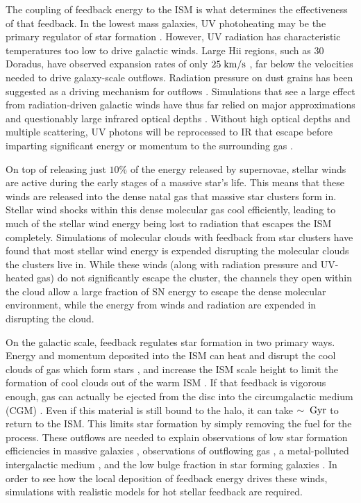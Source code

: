 The coupling of feedback energy to the ISM is what determines the effectiveness
of that feedback.  In the lowest mass galaxies, UV photoheating may be the
primary regulator of star formation \citep{Efstathiou1992}.    However, UV
radiation has characteristic temperatures too low to drive galactic winds.
Large {\sc Hii} regions, such as 30 Doradus, have observed expansion rates of
only $25\;\rm{km/s}$ \citep{Chu1994}, far below the velocities needed to drive
galaxy-scale outflows.  Radiation pressure on dust grains has been suggested as
a driving mechanism for outflows \citep{Murray2011}.  Simulations that see a
large effect from radiation-driven galactic winds have thus far relied on major approximations
\citep{Roskar2014,Agertz2015} and questionably large infrared optical depths
\citep{Hopkins2014}.  Without high optical depths and multiple scattering, UV
photons will be reprocessed to IR that escape before imparting significant
energy or momentum to the surrounding gas \citep{Dale2005,Walch2012,Krumholz2013}.

On top of releasing just $10\%$ of the energy released by supernovae, stellar
winds are active during the early stages of a massive star's life.  This means
that these winds are released into the dense natal gas that massive star
clusters form in.  Stellar wind shocks within this dense molecular gas cool
efficiently, leading to much of the stellar wind energy being lost to radiation
that escapes the ISM completely.  Simulations of molecular clouds with feedback
from star clusters \citep{Gendelev2012,Rogers2013} have found that most stellar
wind energy is expended disrupting the molecular clouds the clusters live in.
While these winds (along with radiation pressure and UV-heated gas) do not
significantly escape the cluster, the channels they open within the cloud allow
a large fraction of SN energy to escape the dense molecular environment, while
the energy from winds and radiation are expended in disrupting the cloud.

On the galactic scale, feedback regulates star formation in two primary ways.
Energy and momentum deposited into the ISM can heat and disrupt the cool clouds
of gas which form stars \citep{Rogers2013}, and increase the ISM scale height to
limit the formation of cool clouds out of the warm ISM
\citep{Ostriker2010,Benincasa2016}.  If that feedback is vigorous enough, gas
can actually be ejected from the disc into the circumgalactic medium (CGM)
\citep{Larson1974,Heckman1987,Hopkins2012b}.  Even if this material is still
bound to the halo, it can take $\sim\;\rm{Gyr}$ to return to the ISM.  This
limits star formation by simply removing the fuel for the process.  These
outflows are needed to explain observations of low star formation efficiencies
in massive galaxies \citep{Behroozi2013,Moster2013}, observations of outflowing
gas \citep{Lynds1963,Heckman1987}, a metal-polluted intergalactic medium
\citep{Shen2010}, and the low bulge fraction in star forming galaxies
\citep{Brook2012}.  In order to see how the local deposition of feedback energy
drives these winds, simulations with realistic models for hot stellar feedback
are required.

